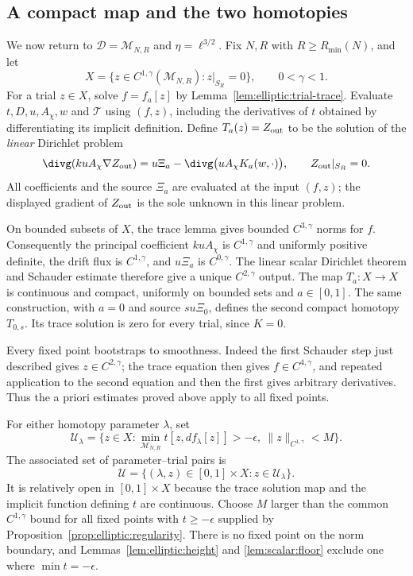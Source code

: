 \subsection{A compact map and the two homotopies}

We now return to $\mathcal D=\mathcal M_{N,R}$ and
$\eta=\ell^{3/2}$.  Fix $N,R$ with $R\ge R_{\min}(N)$, and let
\[
 X=\{z\in C^{1,\gamma}(\mathcal M_{N,R}):z|_{S_R}=0\},
 \qquad 0<\gamma<1.
\]
For a trial $z\in X$, solve $f=f_a[z]$ by
Lemma~\ref{lem:elliptic:trial-trace}.  Evaluate $t,D,u,A_\chi,w$ and
$\mathcal T$ using $(f,z)$, including the derivatives of $t$ obtained
by differentiating its implicit definition.  Define $T_a(z)=Z_{\rm out}$
to be the solution of the \emph{linear} Dirichlet problem
\begin{equation}\label{eq:elliptic:compact-map}
 \divg(ku A_\chi\nabla Z_{\rm out})
   =u\Xi_a-\divg\bigl(uA_\chi K_a(w,\cdot)\bigr),
 \qquad Z_{\rm out}|_{S_R}=0.
\end{equation}
All coefficients and the source $\Xi_a$ are evaluated at the input
$(f,z)$; the displayed gradient of $Z_{\rm out}$ is the sole unknown
in this linear problem.

On bounded subsets of $X$, the trace lemma gives bounded
$C^{3,\gamma}$ norms for $f$.  Consequently the principal coefficient
$kuA_\chi$ is $C^{1,\gamma}$ and uniformly positive definite, the
drift flux is $C^{1,\gamma}$, and $u\Xi_a$ is $C^{0,\gamma}$.
The linear scalar Dirichlet theorem and Schauder estimate therefore
give a unique $C^{2,\gamma}$ output.  The map $T_a:X\to X$ is continuous
and compact, uniformly on bounded sets and $a\in[0,1]$.
The same construction, with $a=0$ and source $s u\Xi_0$, defines
the second compact homotopy $T_{0,s}$.  Its trace solution is zero for
every trial, since $K=0$.

Every fixed point bootstraps to smoothness.  Indeed the first
Schauder step just described gives $z\in C^{2,\gamma}$; the trace
equation then gives $f\in C^{4,\gamma}$, and repeated application to
the second equation and then the first gives arbitrary derivatives.
Thus the a priori estimates proved above apply to all fixed points.

For either homotopy parameter $\lambda$, set
\begin{equation}\label{eq:elliptic:degree-domain}
 \mathcal U_\lambda
 =\{z\in X:\min_{\mathcal M_{N,R}}t[z,df_\lambda[z]]>-\epsilon,
                         \ \|z\|_{C^{1,\gamma}}<M\}.
\end{equation}
The associated set of parameter--trial pairs is
\[
 \mathcal U=\{(\lambda,z)\in[0,1]\times X:z\in\mathcal U_\lambda\}.
\]
It is relatively open in $[0,1]\times X$ because the trace solution
map and the implicit function defining $t$ are continuous.  Choose $M$ larger than the common $C^{1,\gamma}$ bound
for all fixed points with $t\ge-\epsilon$ supplied by
Proposition~\ref{prop:elliptic:regularity}.  There is no fixed point
on the norm boundary, and Lemmas~\ref{lem:elliptic:height} and
\ref{lem:scalar:floor} exclude one where $\min t=-\epsilon$.

